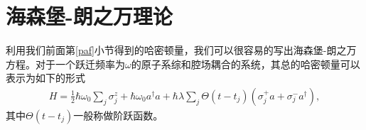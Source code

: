 \vbox{}
\section{海森堡-朗之万理论}\label{section23}
\vbox{}
利用我们前面第\ref{paf}小节得到的哈密顿量，我们可以很容易的写出海森堡-朗之万方程\cite{scully1998quantum}。对于一个跃迁频率为$\omega$的原子系综和腔场耦合的系统，其总的哈密顿量可以表示为如下的形式
\begin{align}
H = \frac{1}{2}\hbar {\omega _0}\sum\nolimits_j {\sigma _j^z}  + \hbar {\omega _0}{a^\dag }a + \hbar \lambda \sum\nolimits_j {\Theta \left( {t - {t_j}} \right)} \left( {\sigma _j^ + a + \sigma _j^ - {a^\dag }} \right),\label{eq58}
\end{align}
其中$\Theta \left( {t - {t_j}} \right)$一般称做阶跃函数。

